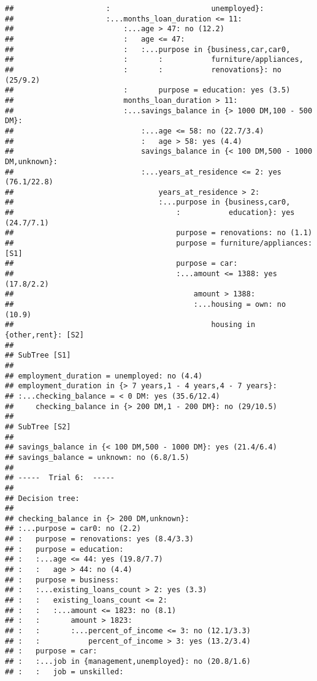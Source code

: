 \documentclass[
]{article}
\begin{document}
\begin{verbatim}
##                     :                       unemployed}:
##                     :...months_loan_duration <= 11:
##                         :...age > 47: no (12.2)
##                         :   age <= 47:
##                         :   :...purpose in {business,car,car0,
##                         :       :           furniture/appliances,
##                         :       :           renovations}: no (25/9.2)
##                         :       purpose = education: yes (3.5)
##                         months_loan_duration > 11:
##                         :...savings_balance in {> 1000 DM,100 - 500 DM}:
##                             :...age <= 58: no (22.7/3.4)
##                             :   age > 58: yes (4.4)
##                             savings_balance in {< 100 DM,500 - 1000 DM,unknown}:
##                             :...years_at_residence <= 2: yes (76.1/22.8)
##                                 years_at_residence > 2:
##                                 :...purpose in {business,car0,
##                                     :           education}: yes (24.7/7.1)
##                                     purpose = renovations: no (1.1)
##                                     purpose = furniture/appliances: [S1]
##                                     purpose = car:
##                                     :...amount <= 1388: yes (17.8/2.2)
##                                         amount > 1388:
##                                         :...housing = own: no (10.9)
##                                             housing in {other,rent}: [S2]
## 
## SubTree [S1]
## 
## employment_duration = unemployed: no (4.4)
## employment_duration in {> 7 years,1 - 4 years,4 - 7 years}:
## :...checking_balance = < 0 DM: yes (35.6/12.4)
##     checking_balance in {> 200 DM,1 - 200 DM}: no (29/10.5)
## 
## SubTree [S2]
## 
## savings_balance in {< 100 DM,500 - 1000 DM}: yes (21.4/6.4)
## savings_balance = unknown: no (6.8/1.5)
## 
## -----  Trial 6:  -----
## 
## Decision tree:
## 
## checking_balance in {> 200 DM,unknown}:
## :...purpose = car0: no (2.2)
## :   purpose = renovations: yes (8.4/3.3)
## :   purpose = education:
## :   :...age <= 44: yes (19.8/7.7)
## :   :   age > 44: no (4.4)
## :   purpose = business:
## :   :...existing_loans_count > 2: yes (3.3)
## :   :   existing_loans_count <= 2:
## :   :   :...amount <= 1823: no (8.1)
## :   :       amount > 1823:
## :   :       :...percent_of_income <= 3: no (12.1/3.3)
## :   :           percent_of_income > 3: yes (13.2/3.4)
## :   purpose = car:
## :   :...job in {management,unemployed}: no (20.8/1.6)
## :   :   job = unskilled:

\end{verbatim}
\end{document}
